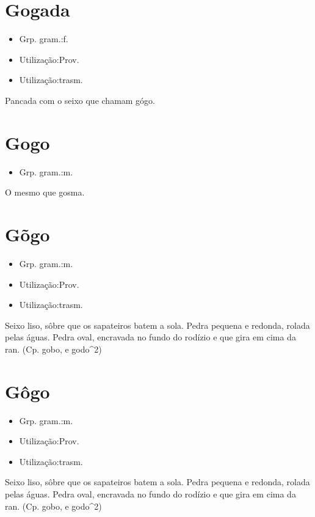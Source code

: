 \section{Gogada}
\begin{itemize}
\item {Grp. gram.:f.}
\end{itemize}
\begin{itemize}
\item {Utilização:Prov.}
\end{itemize}
\begin{itemize}
\item {Utilização:trasm.}
\end{itemize}
Pancada com o seixo que chamam gógo.
\section{Gogo}
\begin{itemize}
\item {Grp. gram.:m.}
\end{itemize}
O mesmo que \textunderscore gosma\textunderscore .
\section{Gõgo}
\begin{itemize}
\item {Grp. gram.:m.}
\end{itemize}
\begin{itemize}
\item {Utilização:Prov.}
\end{itemize}
\begin{itemize}
\item {Utilização:trasm.}
\end{itemize}
Seixo liso, sôbre que os sapateiros batem a sola.
Pedra pequena e redonda, rolada pelas águas.
Pedra oval, encravada no fundo do rodízio e que gira em cima da ran.
(Cp. \textunderscore gobo\textunderscore , e \textunderscore godo\textunderscore ^2)
\section{Gôgo}
\begin{itemize}
\item {Grp. gram.:m.}
\end{itemize}
\begin{itemize}
\item {Utilização:Prov.}
\end{itemize}
\begin{itemize}
\item {Utilização:trasm.}
\end{itemize}
Seixo liso, sôbre que os sapateiros batem a sola.
Pedra pequena e redonda, rolada pelas águas.
Pedra oval, encravada no fundo do rodízio e que gira em cima da ran.
(Cp. \textunderscore gobo\textunderscore , e \textunderscore godo\textunderscore ^2)
